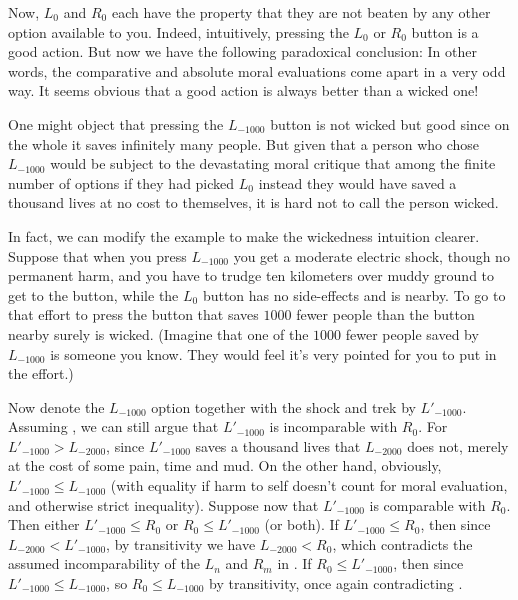 Now, $L_0$ and $R_0$ each have the property that they are not beaten by any other option available to you.
Indeed, intuitively, pressing the $L_0$ or $R_0$ button is a good action. But now we have the following 
paradoxical conclusion:
In other words, the comparative and absolute moral evaluations come apart in a very odd way. It seems obvious
that a good action is always better than a wicked one!

One might object that pressing the $L_{-1000}$ button is not wicked but good since on the whole it saves 
infinitely many people. But given that a person who chose $L_{-1000}$ would be subject to the devastating
moral critique that among the finite number of options if they had picked $L_0$ instead they would 
have saved a thousand lives at no cost to themselves, it is hard not to call the person wicked. 

In fact, we can modify the example to make the wickedness intuition clearer. Suppose that when you press
$L_{-1000}$ you get a moderate electric shock, though no permanent harm, and you have to trudge ten 
kilometers over muddy ground to get to the button, while the $L_0$ button has no side-effects and is nearby.
To go to that effort to press the button that saves $1000$ fewer people than the button nearby surely is 
wicked. (Imagine that one of the $1000$ fewer people saved by $L_{-1000}$ is someone you know. They would feel it's 
very pointed for you to put in the effort.) 

Now denote the $L_{-1000}$ option together with the shock and trek by $L'_{-1000}$. Assuming , 
we can still argue that $L'_{-1000}$ is incomparable with $R_0$. For $L'_{-1000} > L_{-2000}$, since
$L'_{-1000}$ saves a thousand lives that $L_{-2000}$ does not, merely at the cost of some pain, time and mud. 
On the other hand, obviously, $L'_{-1000} \le L_{-1000}$ (with equality if harm to self doesn't count for moral
evaluation, and otherwise strict inequality).
Suppose now that $L'_{-1000}$ is comparable with $R_0$. Then either $L'_{-1000} \le R_0$
or $R_0 \le L'_{-1000}$ (or both). If $L'_{-1000} \le R_0$, then since $L_{-2000} < L'_{-1000}$, by transitivity
we have $L_{-2000} < R_0$, which contradicts the assumed incomparability of the $L_n$ and $R_m$ in .
If $R_0 \le L'_{-1000}$, then since $L'_{-1000} \le L_{-1000}$, so $R_0 \le L_{-1000}$ by transitivity, once 
again contradicting .

